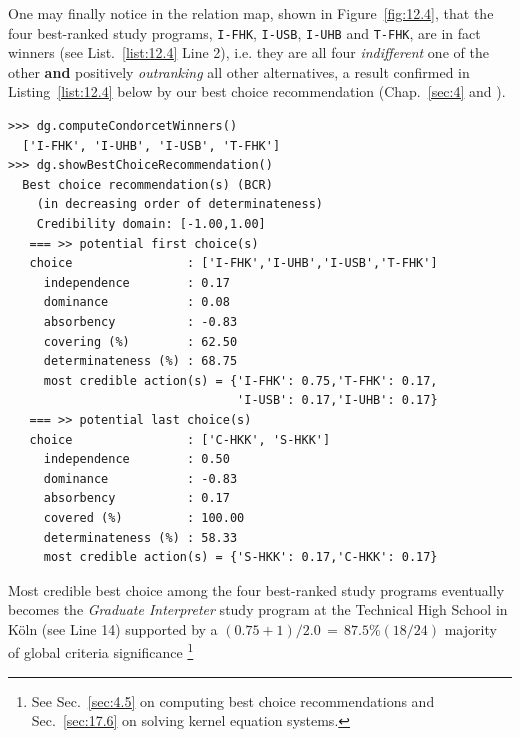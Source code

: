 One may finally notice in the relation map, shown in Figure~\vref{fig:12.4}, that the four best-ranked study programs, \texttt{I-FHK}, \texttt{I-USB}, \texttt{I-UHB} and \texttt{T-FHK},  are in fact \Condorcet winners (see List.~\vref{list:12.4} Line 2), i.e. they are all four \emph{indifferent} one of the other \textbf{and} positively \emph{outranking} all other alternatives, a result confirmed in Listing~\vref{list:12.4} below by our \Rubis best choice recommendation (Chap.~\ref{sec:4} and \citealp*{BIS-2008a}).
\begin{lstlisting}[caption={Alice's best choice recommendation},label=list:12.4]
>>> dg.computeCondorcetWinners()
  ['I-FHK', 'I-UHB', 'I-USB', 'T-FHK'] 
>>> dg.showBestChoiceRecommendation()
  Best choice recommendation(s) (BCR)
    (in decreasing order of determinateness)   
    Credibility domain: [-1.00,1.00]
   === >> potential first choice(s)
   choice                : ['I-FHK','I-UHB','I-USB','T-FHK']
     independence        : 0.17
     dominance           : 0.08
     absorbency          : -0.83
     covering (%)        : 62.50
     determinateness (%) : 68.75
     most credible action(s) = {'I-FHK': 0.75,'T-FHK': 0.17,
                                'I-USB': 0.17,'I-UHB': 0.17}
   === >> potential last choice(s) 
   choice                : ['C-HKK', 'S-HKK']
     independence        : 0.50
     dominance           : -0.83
     absorbency          : 0.17
     covered (%)         : 100.00
     determinateness (%) : 58.33
     most credible action(s) = {'S-HKK': 0.17,'C-HKK': 0.17}
\end{lstlisting}

Most credible best choice among the four best-ranked study programs eventually becomes the \emph{Graduate Interpreter} study program at the Technical High School in Köln (see Line 14) supported by a $(0.75 + 1)/2.0 \,=\,87.5\% (18/24)$ majority of global criteria significance \footnote{See Sec.~\ref{sec:4.5} on computing best choice recommendations and Sec.~\ref{sec:17.6} on solving kernel equation systems.}

